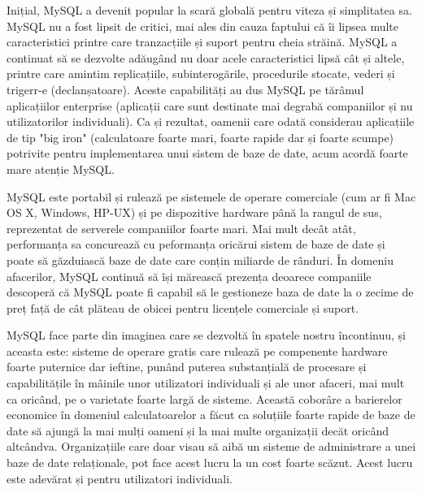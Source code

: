 \documentclass[12pt]{book}
\begin{document}
Inițial, MySQL a devenit popular la scară globală pentru viteza și simplitatea sa. MySQL nu a fost lipsit de critici, mai ales din cauza faptului că îi lipsea multe caracteristici printre care tranzacțiile și suport pentru cheia străină. MySQL a continuat să se dezvolte adăugând nu doar acele caracteristici lipsă cât și altele, printre care amintim replicațiile, subinterogările, procedurile stocate, vederi și trigerr-e (declanșatoare). Aceste capabilități au dus MySQL pe tărâmul aplicațiilor enterprise (aplicații care sunt destinate mai degrabă companiilor și nu utilizatorilor individuali). Ca și rezultat, oamenii care odată considerau aplicațiile de tip "big iron" (calculatoare foarte mari, foarte rapide dar și foarte scumpe) potrivite pentru implementarea unui sistem de baze de date, acum acordă foarte mare atenție MySQL. 

MySQL este portabil și rulează pe sistemele de operare comerciale (cum ar fi Mac OS X, Windows, HP-UX) și pe dispozitive hardware până la rangul de sus, reprezentat de serverele companiilor foarte mari. Mai mult decât atât, performanța sa concurează cu peformanța oricărui sistem de baze de date și poate să găzduiască baze de date care conțin miliarde de rânduri. În domeniu afacerilor, MySQL continuă să își mărească prezența deoarece companiile descoperă că MySQL poate fi capabil să le gestioneze baza de date la o zecime de preț față de cât plăteau de obicei pentru licențele comerciale și suport.

MySQL face parte din imaginea care se dezvoltă în spatele nostru încontinuu, și aceasta este: sisteme de operare gratis care rulează pe compenente hardware foarte puternice dar ieftine, punând puterea substanțială de procesare și capabilitățile în mâinile unor utilizatori individuali și ale unor afaceri, mai mult ca oricând, pe o varietate foarte largă de sisteme. Această coborâre a barierelor economice în domeniul calculatoarelor a făcut ca soluțiile foarte rapide de baze de date să ajungă la mai mulți oameni și la mai multe organizații decăt oricând altcândva. Organizațiile care doar visau să aibă un sisteme de administrare a unei baze de date relaționale, pot face acest lucru la un cost foarte scăzut. Acest lucru este adevărat și pentru utilizatori individuali.
\end{document}
